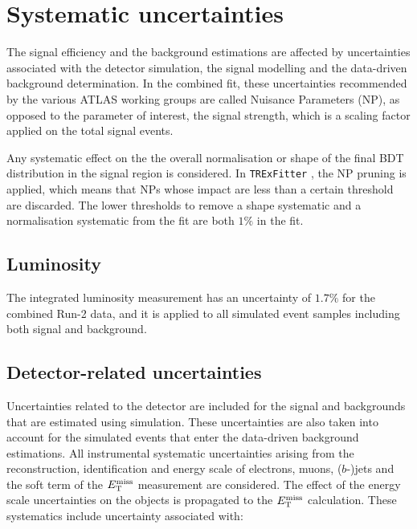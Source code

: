 \section{Systematic uncertainties}
\label{sec:systematics}
The signal efficiency and the background estimations are affected by uncertainties associated with the detector simulation, the signal modelling and the data-driven background determination. In the combined fit, these uncertainties recommended by the various ATLAS working groups are called Nuisance Parameters (NP), as opposed to the parameter of interest, the signal strength, which is a scaling factor applied on the total signal events.

Any systematic effect on the the overall normalisation or shape of the final BDT distribution in the signal region is considered. In \texttt{TRExFitter} \cite{TRExFitter}, the NP pruning is applied, which means that NPs whose impact are less than a certain threshold are discarded. The lower thresholds to remove a shape systematic and a normalisation systematic from the fit are both $1\%$ in the fit.

%

\subsection{Luminosity}
\label{sec:systematic_Luminosity}
The integrated luminosity measurement has an uncertainty of $1.7\%$ for the combined Run-2 data, and it is applied to all simulated event samples including both signal and background.

\subsection{Detector-related uncertainties}
\label{sec:syst_det}

Uncertainties related to the detector are included for the signal and backgrounds that are estimated using simulation. These uncertainties are also taken into account for the simulated events that enter the data-driven background estimations. All instrumental systematic uncertainties arising from the reconstruction, identification and energy scale of electrons, muons, ($b$-)jets and the soft term of the $E_{\text{T}}^{\text{miss}}$ measurement are considered. The effect of the energy scale uncertainties on the objects is propagated to the $E_{\text{T}}^{\text{miss}}$ calculation. These systematics include uncertainty associated with:

